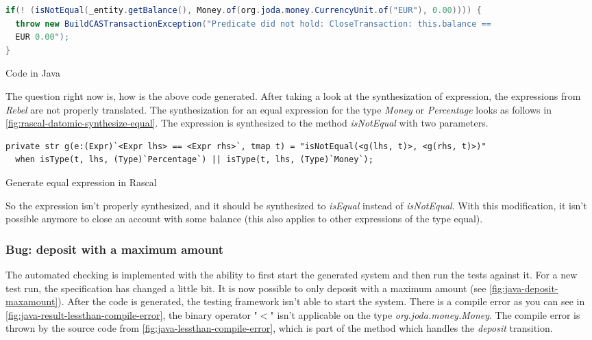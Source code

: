 \begin{sourcecode}[h!]
\begin{lstlisting}[language=Java]
if(! (isNotEqual(_entity.getBalance(), Money.of(org.joda.money.CurrencyUnit.of("EUR"), 0.00)))) {
  throw new BuildCASTransactionException("Predicate did not hold: CloseTransaction: this.balance ==
  EUR 0.00");
}
\end{lstlisting}
\caption{Code in Java}\label{fig:java-notequal-check}
\end{sourcecode}

The question right now is, how is the above code generated. After taking a look at the synthesization of
expression, the expressions from \textit{Rebel} are not properly translated. The
synthesization for an equal expression for the type \textit{Money} or \textit{Percentage} looks as
follows in \autoref{fig:rascal-datomic-synthesize-equal}. The expression is
synthesized to the method \textit{isNotEqual} with two parameters.

\begin{sourcecode}[h!]
\begin{lstlisting}[]
private str g(e:(Expr)`<Expr lhs> == <Expr rhs>`, tmap t) = "isNotEqual(<g(lhs, t)>, <g(rhs, t)>)"
  when isType(t, lhs, (Type)`Percentage`) || isType(t, lhs, (Type)`Money`);
\end{lstlisting}
\caption{Generate equal expression in Rascal}\label{fig:rascal-datomic-synthesize-equal}
\end{sourcecode}

So the expression isn't properly synthesized, and it should be synthesized to
\textit{isEqual} instead of \textit{isNotEqual}. With this modification, it
isn't possible anymore to close an account with some balance (this also applies
to other expressions of the type equal).

\subsubsection{Bug: deposit with a maximum amount}\label{sec:bug-compile-max-deposit}

The automated checking is implemented with the ability to first start the
generated system and then run the tests against it. For a new test run, the
specification has changed a little bit. It is now possible to only deposit with
a maximum amount (see \autoref{fig:java-deposit-maxamount}). After the code is
generated, the testing framework isn't able to start the system. There is a
compile error as you can see in
\autoref{fig:java-result-lessthan-compile-error}, the binary operator "$<$"
isn't applicable on the type \textit{org.joda.money.Money}. The compile error
is thrown by the source code from \autoref{fig:java-lessthan-compile-error},
which is part of the method which handles the \textit{deposit} transition.

